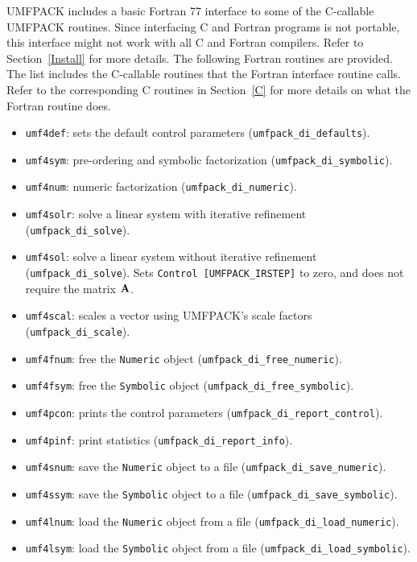 \documentclass[11pt]{article}
\newcommand{\m}[1]{{\bf{#1}}}       %
\begin{document}
UMFPACK includes a basic Fortran 77 interface to some of the C-callable
UMFPACK routines.
Since interfacing C and Fortran programs is not portable, this interface might
not work with all C and Fortran compilers.  Refer to Section~\ref{Install} for
more details.  The following Fortran routines are provided.
The list includes the C-callable routines that the Fortran interface
routine calls.  Refer to the corresponding C routines in Section~\ref{C} for
more details on what the Fortran routine does.

\begin{itemize}
\item {\tt umf4def}: sets the default control parameters
    ({\tt umfpack\_di\_defaults}).

\item {\tt umf4sym}: pre-ordering and symbolic factorization
    ({\tt umfpack\_di\_symbolic}).

\item {\tt umf4num}: numeric factorization
    ({\tt umfpack\_di\_numeric}).

\item {\tt umf4solr}: solve a linear system with iterative refinement
    ({\tt umfpack\_di\_solve}).

\item {\tt umf4sol}: solve a linear system without iterative refinement
    ({\tt umfpack\_di\_solve}).  Sets {\tt Control [UMFPACK\_IRSTEP]}
    to zero, and does not require the matrix $\m{A}$.

\item {\tt umf4scal}: scales a vector using UMFPACK's scale factors
    ({\tt umfpack\_di\_scale}).

\item {\tt umf4fnum}: free the {\tt Numeric} object
    ({\tt umfpack\_di\_free\_numeric}).

\item {\tt umf4fsym}: free the {\tt Symbolic} object
    ({\tt umfpack\_di\_free\_symbolic}).

\item {\tt umf4pcon}: prints the control parameters
    ({\tt umfpack\_di\_report\_control}).

\item {\tt umf4pinf}: print statistics
    ({\tt umfpack\_di\_report\_info}).

\item {\tt umf4snum}: save the {\tt Numeric} object to a file
    ({\tt umfpack\_di\_save\_numeric}).

\item {\tt umf4ssym}: save the {\tt Symbolic} object to a file
    ({\tt umfpack\_di\_save\_symbolic}).

\item {\tt umf4lnum}: load the {\tt Numeric} object from a file
    ({\tt umfpack\_di\_load\_numeric}).

\item {\tt umf4lsym}: load the {\tt Symbolic} object from a file
    ({\tt umfpack\_di\_load\_symbolic}).
\end{itemize}
\end{document}
